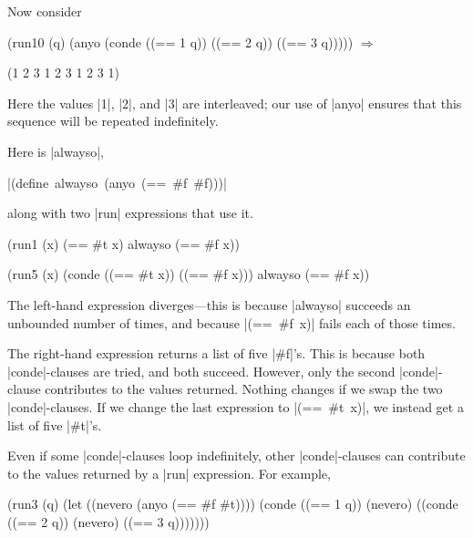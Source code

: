 Now consider

\schemedisplayspace
\begin{schemedisplay}
(run10 (q)
  (anyo 
    (conde
      ((== 1 q))
      ((== 2 q))
      ((== 3 q))))) $\Rightarrow$
\end{schemedisplay}
\nspace
\begin{schemeresponse}
(1 2 3 1 2 3 1 2 3 1)
\end{schemeresponse}


\noindent Here the values \scheme|1|, \scheme|2|, and \scheme|3| are interleaved;
our use of \scheme|anyo| ensures that this sequence will be repeated indefinitely.

Here is \scheme|alwayso|,

\wspace

\noindent\mbox{\scheme|(define alwayso (anyo (== #f #f)))|}

\wspace

\noindent along with two \scheme|run| expressions that use it.

\schemedisplayspace
\begin{schemebox}
(run1 (x)
  (== #t x)
  alwayso
  (== #f x))
$\ $
$\ $
\end{schemebox}
\hspace{2cm}
\begin{schemebox}
(run5 (x)
  (conde
    ((== #t x))
    ((== #f x)))
  alwayso
  (== #f x))
\end{schemebox}

\wspace

\noindent The left-hand expression diverges---this is because 
\scheme|alwayso| succeeds an unbounded number of times, 
and because \mbox{\scheme|(== #f x)|} fails each of those times.

The right-hand expression returns a list of five \scheme|#f|'s.  This
is because both \scheme|conde|-clauses are tried, and both succeed.
However, only the second \scheme|conde|-clause contributes to the
values returned. Nothing changes if we swap the two
\scheme|conde|-clauses.  If we change the last expression to
\mbox{\scheme|(== #t x)|}, we instead get a list of five
\scheme|#t|'s.

Even if some \scheme|conde|-clauses loop indefinitely, other
\scheme|conde|-clauses can contribute to the values returned by a
\scheme|run| expression.
For example,

\schemedisplayspace
\begin{schemedisplay}
(run3 (q)
  (let ((nevero (anyo (== #f #t))))
    (conde
      ((== 1 q))
      (nevero)
      ((conde
         ((== 2 q))
         (nevero)
         ((== 3 q)))))))
\end{schemedisplay}

